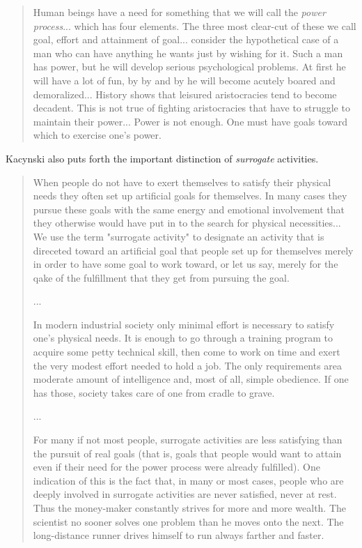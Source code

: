 \documentclass[10pt,letterpaper,openany]{book}
\begin{document}
\begin{quote}
Human beings have a need for something that we will call the \textit{power process}... which has four elements. The three most clear-cut of these we call goal, effort and attainment of goal... consider the hypothetical case of a man who can have anything he wants just by wishing for it. Such a man has power, but he will develop serious psychological problems. At first he will have a lot of fun, by by and by he will become acutely boared and demoralized... History shows that leisured aristocracies tend to become decadent. This is not true of fighting aristocracies that have to struggle to maintain their power... Power is not enough. One must have goals toward which to exercise one's power.
\end{quote}

Kacynski also puts forth the important distinction of \textit{surrogate} activities.

\begin{quote}
When people do not have to exert themselves to satisfy their physical needs they often set up artificial goals for themselves. In many cases they pursue these goals with the same energy and emotional involvement that they otherwise would have put in to the search for physical necessities... We use the term "surrogate activity" to designate an activity that is direceted toward an artificial goal that people set up for themselves merely in order to have some goal to work toward, or let us say, merely for the qake of the fulfillment that they get from pursuing the goal.

...

In modern industrial society only minimal effort is necessary to satisfy one's physical needs. It is enough to go through a training program to acquire some petty technical skill, then come to work on time and exert the very modest effort needed to hold a job. The only requirements area moderate amount of intelligence and, most of all, simple obedience. If one has those, society takes care of one from cradle to grave.

...

For many if not most people, surrogate activities are less satisfying than the pursuit of real goals (that is, goals that people would want to attain even if their need for the power process were already fulfilled). One indication of this is the fact that, in many or most cases, people who are deeply involved in surrogate activities are never satisfied, never at rest. Thus the money-maker constantly strives for more and more wealth. The scientist no sooner solves one problem than he moves onto the next. The long-distance runner drives himself to run always farther and faster.
\end{quote}
\end{document}
